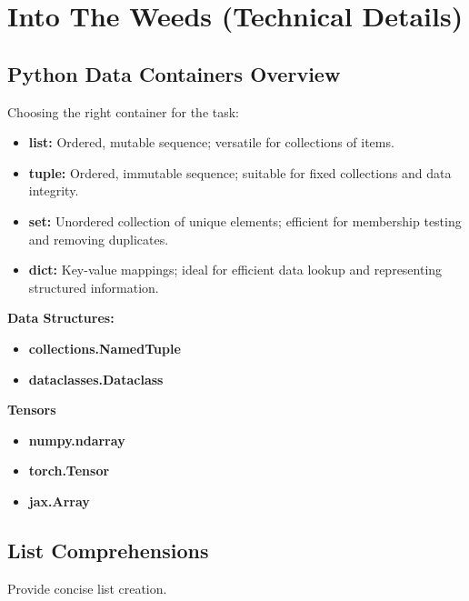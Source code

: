 \section{Into The Weeds (Technical Details)}
\subsection{Python Data Containers Overview}
\begin{definition}
    Choosing the right container for the task:
    \begin{itemize}
        \item \textbf{list:} Ordered, mutable sequence; versatile for collections of items.
        \item \textbf{tuple:} Ordered, immutable sequence; suitable for fixed collections and data integrity.
        \item \textbf{set:} Unordered collection of unique elements; efficient for membership testing and removing duplicates.
        \item \textbf{dict:} Key-value mappings; ideal for efficient data lookup and representing structured information.
    \end{itemize}
    \vspace{1em}
    
    \textbf{Data Structures:}
    \begin{itemize}
        \item \textbf{collections.NamedTuple}
        \item \textbf{dataclasses.Dataclass}
    \end{itemize}
    \vspace{1em}

    \textbf{Tensors}
    \begin{itemize}
        \item \textbf{numpy.ndarray}
        \item \textbf{torch.Tensor}
        \item \textbf{jax.Array}
    \end{itemize}
\end{definition}

\subsection{List Comprehensions}
\begin{notes}
    Provide concise list creation.
\end{notes}

